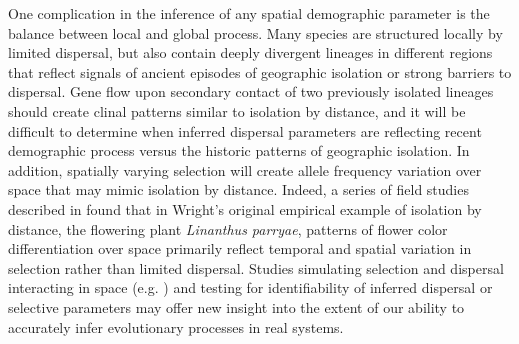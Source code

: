 \documentclass[11pt,twoside,lineno]{preprint}
\begin{document}
One complication in the inference of any spatial demographic parameter is the balance between local and global process. Many species are structured locally by limited dispersal, but also contain deeply divergent lineages in different regions that reflect signals of ancient episodes of geographic isolation or strong barriers to dispersal. Gene flow upon secondary contact of two previously isolated lineages should create clinal patterns similar to isolation by distance, and it will be difficult to determine when inferred dispersal parameters are reflecting recent demographic process versus the historic patterns of geographic isolation. In addition, spatially varying selection will create allele frequency variation over space that may mimic isolation by distance. Indeed, a series of field studies described in \cite{Schemske2007} found that in Wright's original empirical example of isolation by distance, the flowering plant \textit{Linanthus parryae}, patterns of flower color differentiation over space primarily reflect temporal and spatial variation in selection rather than limited dispersal. Studies simulating selection and dispersal interacting in space (e.g. \cite{Ralph2010}) and testing for identifiability of inferred dispersal or selective parameters may offer new insight into the extent of our ability to accurately infer evolutionary processes in real systems. 

\end{document}
